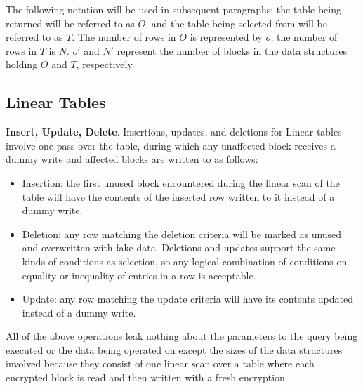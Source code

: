 \documentclass[letterpaper,twocolumn,10pt]{article}
\begin{document}
The following notation will be used in subsequent paragraphs: the table being returned will be referred to as $O$, and the table being selected from will be referred to as $T$. The number of rows in $O$ is represented by $o$, the number of rows in $T$ is $N$. $o'$ and $N'$ represent the number of blocks in the data structures holding $O$ and $T$, respectively. 

\subsection{Linear Tables}
  \noindent \textbf{Insert, Update, Delete}. 
Insertions, updates, and deletions for Linear tables involve one pass over the table, during which any unaffected block receives a dummy write and affected blocks are written to as follows:
\begin{itemize}[itemsep=0pt,parsep=0pt]
\item Insertion: the first unused block encountered during the linear scan of the table will have the contents of the inserted row written to it instead of a dummy write.
\item Deletion: any row matching the deletion criteria will be marked as unused and overwritten with fake data. Deletions and updates support the same kinds of conditions as selection, so any logical combination of conditions on equality or inequality of entries in a row is acceptable. 
\item Update: any row matching the update criteria will have its contents updated instead of a dummy write. 
\end{itemize}

All of the above operations leak nothing about the parameters to the query being executed or the data being operated on except the sizes of the data structures involved because they consist of one linear scan over a table where each encrypted block is read and then written with a fresh encryption. 
\end{document}
